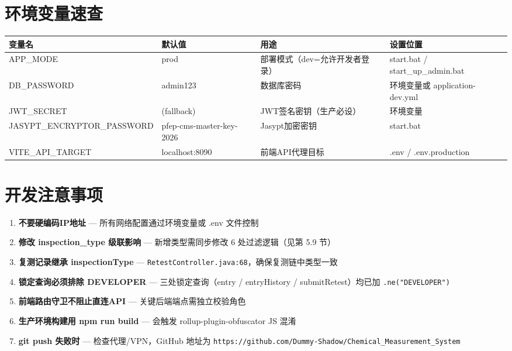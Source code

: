 \documentclass[12pt,a4paper]{ctexart}
\begin{document}
\newpage
\section{环境变量速查}

\begin{longtable}{|l|l|l|p{4cm}|}
\hline
\textbf{变量名} & \textbf{默认值} & \textbf{用途} & \textbf{设置位置} \\
\hline
\endfirsthead
\hline
\endhead
\hline
APP\_MODE & prod & 部署模式（dev=允许开发者登录） & start.bat / start\_up\_admin.bat \\
DB\_PASSWORD & admin123 & 数据库密码 & 环境变量或 application-dev.yml \\
JWT\_SECRET & (fallback) & JWT签名密钥（生产必设） & 环境变量 \\
JASYPT\_ENCRYPTOR\_PASSWORD & pfep-cms-master-key-2026 & Jasypt加密密钥 & start.bat \\
VITE\_API\_TARGET & localhost:8090 & 前端API代理目标 & .env / .env.production \\
\hline
\end{longtable}

\section{开发注意事项}

\begin{enumerate}
    \item \textbf{不要硬编码IP地址} — 所有网络配置通过环境变量或 .env 文件控制
    \item \textbf{修改 inspection\_type 级联影响} — 新增类型需同步修改 6 处过滤逻辑（见第 5.9 节）
    \item \textbf{复测记录继承 inspectionType} — \texttt{RetestController.java:68}，确保复测链中类型一致
    \item \textbf{锁定查询必须排除 DEVELOPER} — 三处锁定查询（entry / entryHistory / submitRetest）均已加 \texttt{.ne("DEVELOPER")}
    \item \textbf{前端路由守卫不阻止直连API} — 关键后端端点需独立校验角色
    \item \textbf{生产环境构建用 npm run build} — 会触发 rollup-plugin-obfuscator JS 混淆
    \item \textbf{git push 失败时} — 检查代理/VPN，GitHub 地址为 \texttt{https://github.com/Dummy-Shadow/Chemical\_Measurement\_System}
\end{enumerate}
\end{document}
